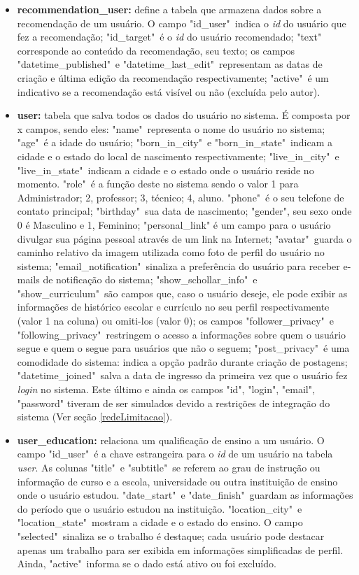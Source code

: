 \begin{itemize}
    \item \textbf{recommendation\_user:} define a tabela que armazena dados sobre a recomendação de um usuário. O campo "id\_user"\ indica o \textit{id} do usuário que fez a recomendação; "id\_target"\ é o \textit{id} do usuário recomendado; "text" corresponde ao conteúdo da recomendação, seu texto; os campos "datetime\_published"\ e "datetime\_last\_edit"\ representam as datas de criação e última edição da recomendação respectivamente; "active"\ é um indicativo se a recomendação está visível ou não (excluída pelo autor).
    
    \item \textbf{user:} tabela que salva todos os dados do usuário no sistema. É composta por x campos, sendo eles: "name"\ representa o nome do usuário no sistema; "age"\ é a idade do usuário; "born\_in\_city"\ e "born\_in\_state"\ indicam a cidade e o estado do local de nascimento respectivamente; "live\_in\_city"\ e "live\_in\_state"\ indicam a cidade e o estado onde o usuário reside no momento. "role"\ é a função deste no sistema sendo o valor 1 para Administrador; 2, professor; 3, técnico; 4, aluno. "phone"\ é o seu telefone de contato principal; "birthday"\ sua data de nascimento; "gender", seu sexo onde 0 é Masculino e 1, Feminino; "personal\_link" é um campo para o usuário divulgar sua página pessoal através de um link na Internet; "avatar"\ guarda o caminho relativo da imagem utilizada como foto de perfil do usuário no sistema; "email\_notification"\ sinaliza a preferência do usuário para receber e-mails de notificação do sistema; "show\_schollar\_info"\ e "show\_curriculum"\ são campos que, caso o usuário deseje, ele pode exibir as informações de histórico escolar e currículo no seu perfil respectivamente (valor 1 na coluna) ou omiti-los (valor 0); os campos "follower\_privacy"\ e "following\_privacy"\ restringem o acesso a informações sobre quem o usuário segue e quem o segue para usuários que não o seguem; "post\_privacy"\ é uma comodidade do sistema: indica a opção padrão durante criação de postagens; "datetime\_joined"\ salva a data de ingresso da primeira vez que o usuário fez \textit{login} no sistema. Este último e ainda os campos "id", "login", "email", "password" tiveram de ser simulados devido a restrições de integração do sistema (Ver seção \ref{redeLimitacao}).
    
    \item \textbf{user\_education:} relaciona um qualificação de ensino a um usuário. O campo "id\_user"\ é a chave estrangeira para o \textit{id} de um usuário na tabela \textit{user}. As colunas "title"\ e "subtitle"\ se referem ao grau de instrução ou informação de curso e a escola, universidade ou outra instituição de ensino onde o usuário estudou. "date\_start"\ e "date\_finish"\ guardam as informações do período que o usuário estudou na instituição. "location\_city"\ e "location\_state"\ mostram a cidade e o estado do ensino. O campo "selected"\ sinaliza se o trabalho é destaque; cada usuário pode destacar apenas um trabalho para ser exibida em informações simplificadas de perfil. Ainda, "active"\ informa se o dado está ativo ou foi excluído.
    

\end{itemize}
